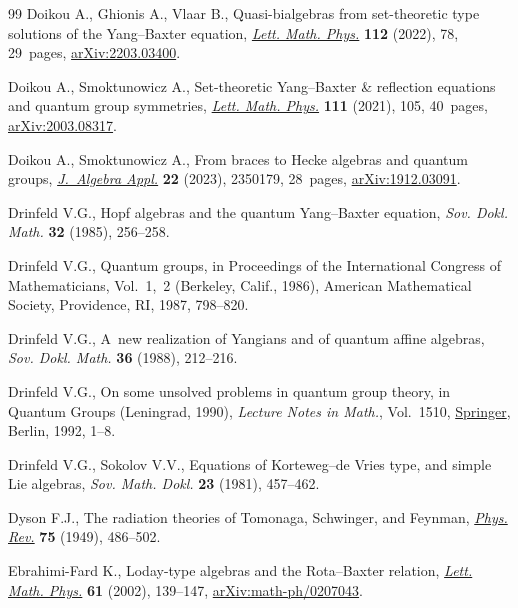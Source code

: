 \begin{thebibliography}{99}
Doikou A., Ghionis A., Vlaar B., Quasi-bialgebras from set-theoretic type
 solutions of the {Y}ang--{B}axter equation,
 \href{https://doi.org/10.1007/s11005-022-01572-9}{\textit{Lett. Math. Phys.}}
 \textbf{112} (2022), 78, 29~pages,
 \href{http://arxiv.org/abs/2203.03400}{arXiv:2203.03400}.

Doikou A., Smoktunowicz A., Set-theoretic {Y}ang--{B}axter \& reflection
 equations and quantum group symmetries,
 \href{https://doi.org/10.1007/s11005-021-01437-7}{\textit{Lett. Math. Phys.}}
 \textbf{111} (2021), 105, 40~pages,
 \href{http://arxiv.org/abs/2003.08317}{arXiv:2003.08317}.

Doikou A., Smoktunowicz A., From braces to {H}ecke algebras and quantum groups,
 \href{https://doi.org/10.1142/S0219498823501797}{\textit{J.~Algebra Appl.}}
 \textbf{22} (2023), 2350179, 28~pages,
 \href{http://arxiv.org/abs/1912.03091}{arXiv:1912.03091}.

Drinfeld V.G., Hopf algebras and the quantum {Y}ang--{B}axter equation,
 \textit{Sov. Dokl. Math.} \textbf{32} (1985), 256--258.

Drinfeld V.G., Quantum groups, in Proceedings of the {I}nternational {C}ongress
 of {M}athematicians, {V}ol.~1,~2 ({B}erkeley, {C}alif., 1986), American
 Mathematical Society, Providence, RI, 1987, 798--820.

Drinfeld V.G., A~new realization of {Y}angians and of quantum affine algebras,
 \textit{Sov. Dokl. Math.} \textbf{36} (1988), 212--216.

Drinfeld V.G., On some unsolved problems in quantum group theory, in Quantum
 Groups ({L}eningrad, 1990), \textit{Lecture Notes in Math.}, Vol.~1510,
 \href{https://doi.org/10.1007/BFb0101175}{Springer}, Berlin, 1992, 1--8.

Drinfeld V.G., Sokolov V.V., Equations of {K}orteweg--de {V}ries type, and
 simple {L}ie algebras, \textit{Sov. Math. Dokl.} \textbf{23} (1981),
 457--462.

Dyson F.J., The radiation theories of {T}omonaga, {S}chwinger, and {F}eynman,
 \href{https://doi.org/10.1103/PhysRev.75.486}{\textit{Phys. Rev.}}
 \textbf{75} (1949), 486--502.

Ebrahimi-Fard K., Loday-type algebras and the {R}ota--{B}axter relation,
 \href{https://doi.org/10.1023/A:1020712215075}{\textit{Lett. Math. Phys.}}
 \textbf{61} (2002), 139--147,
 \href{http://arxiv.org/abs/math-ph/0207043}{arXiv:math-ph/0207043}.


\end{thebibliography}
